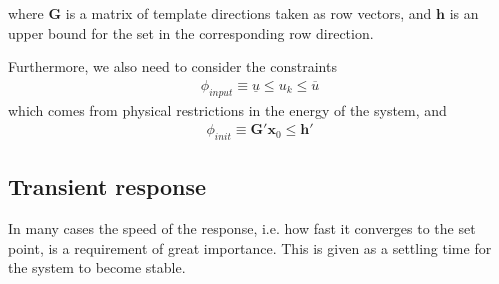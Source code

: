 \documentclass[sigconf]{llncs}
\newcommand{\mat}[1]{\boldsymbol{#1}}
\renewcommand{\vec}[1]{\boldsymbol{#1}}
\begin{document}
where $\mat{G}$ is a matrix of template directions taken as row vectors, and $\vec{h}$ is an upper
bound for the set in the corresponding row direction.

Furthermore, we also need to consider the 
constraints 
\begin{align}
\phi_\mathit{input}\equiv \underline{u} \leq u_k \leq \overline{u}
\label{eq:inputspec}
\end{align}
which comes from physical restrictions in the energy of the system, and
\begin{align}
\phi_\mathit{init}\equiv \mat{G}' \vec{x}_0 \leq \vec{h}'
\label{eq:initspec}
\end{align}

\subsection{Transient response} 
\label{ssec:transientspecification}
In many cases the speed of the response, i.e. how fast it converges to the set point, is a requirement of great importance. 
This is given as a settling time for the system to become stable.
 
\end{document}
